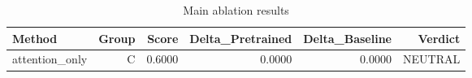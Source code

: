 \begin{table}[htbp]
\centering
\caption{Main ablation results}
\label{tab:main-results}
\begin{tabular}{lrrrrr}
\toprule
\textbf{Method} & \textbf{Group} & \textbf{Score} & \textbf{Delta\_Pretrained} & \textbf{Delta\_Baseline} & \textbf{Verdict} \\
\midrule
attention\_only & C & 0.6000 & 0.0000 & 0.0000 & NEUTRAL \\
\bottomrule
\end{tabular}
\end{table}